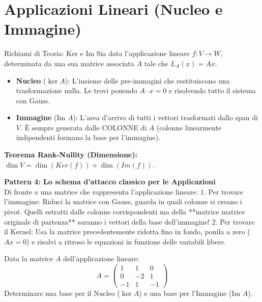 \section{Applicazioni Lineari (Nucleo e Immagine)}

\begin{concept}{Richiami di Teoria: Ker e Im}
Sia data l'applicazione lineare $f: V \to W$, determinata da una sua matrice associata $A$ tale che $L_A(x)=Ax$.
\begin{itemize}
    \item \textbf{Nucleo} ($\ker A$): L'insieme delle pre-immagini che restituiscono una trasformazione nulla. Le trovi ponendo $A \cdot x = 0$ e risolvendo tutto il sistema con Gauss.
    \item \textbf{Immagine} ($\text{Im } A$): L'area d'arrivo di tutti i vettori trasformati dallo span di $V$. È sempre generata dalle COLONNE di $A$ (colonne linearmente indipendenti formano la base per l'immagine).
\end{itemize}
\textbf{Teorema Rank-Nullity (Dimensione):} $\dim V = \dim(Ker(f)) + \dim(Im(f))$.
\end{concept}

\begin{logicbox}
\textbf{Pattern 4: Lo schema d'attacco classico per le Applicazioni}\\
Di fronte a una matrice che rappresenta l'applicazione lineare:
1. Per trovare l'immagine: Riduci la matrice con Gauss, guarda in quali colonne si creano i pivot. Quelli estratti dalle colonne corrispondenti ma della **matrice matrice originale di partenza** saranno i vettori della base dell'immagine!
2. Per trovare il Kernel: Usa la matrice precedentemente ridotta fino in fondo, ponila a zero ($Ax=0$) e risolvi a ritroso le equazioni in funzione delle variabili libere.
\end{logicbox}

\begin{exercisebox}[title={Esercizio 1: Determinare Ker e Im}]
Data la matrice $A$ dell'applicazione lineare:
$$ A = \begin{pmatrix} 1 & 1 & 0 \\ 0 & -2 & 1 \\ -1 & 1 & -1 \end{pmatrix} $$
Determinare una base per il Nucleo ($\ker A$) e una base per l'Immagine ($\text{Im } A$).
\end{exercisebox}

